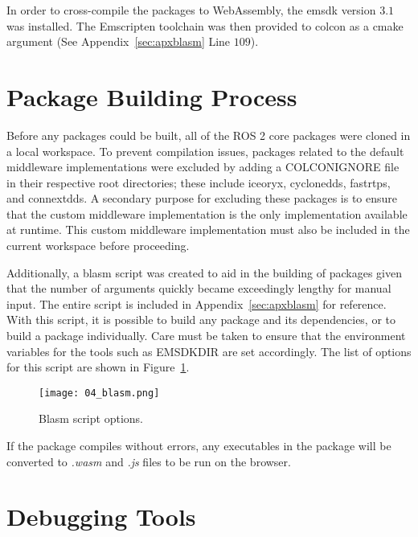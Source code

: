     In order to cross-compile the packages to WebAssembly, the \ac{emsdk} version $3.1$ was installed. The Emscripten toolchain was then provided to \textsf{colcon} as a \textsf{cmake} argument (See Appendix~\ref{sec:apxblasm} Line $109$).


\section{Package Building Process}

    Before any packages could be built, all of the ROS 2 core packages were cloned in a local workspace. To prevent compilation issues, packages related to the default middleware implementations were excluded by adding a \textsf{COLCON}\texttt{\smallunderscore }\textsf{IGNORE} file in their respective root directories; these include \textsf{iceoryx}, \textsf{cyclonedds}, \textsf{fastrtps}, and \textsf{connextdds}. A secondary purpose for excluding these packages is to ensure that the custom middleware implementation is the only implementation available at runtime. This custom middleware implementation must also be included in the current workspace before proceeding. 

    Additionally, a \textsf{blasm} script was created to aid in the building of packages given that the number of arguments quickly became exceedingly lengthy for manual input. The entire script is included in Appendix~\ref{sec:apxblasm} for reference. With this script, it is possible to build any package and its dependencies, or to build a package individually. Care must be taken to ensure that the environment variables for the tools such as \textsf{EMSDK}\texttt{\smallunderscore }\textsf{DIR} are set accordingly. The list of options for this script are shown in Figure~\ref{fig:blasm}.

    \begin{figure}[htbp]
        \centering
        \texttt{[image: 04\_blasm.png]}
        \caption{Blasm script options.}
        \label{fig:blasm}
    \end{figure}


    If the package compiles without errors, any executables in the package will be converted to \textit{.wasm} and \textit{.js} files to be run on the browser.


\section{Debugging Tools}

